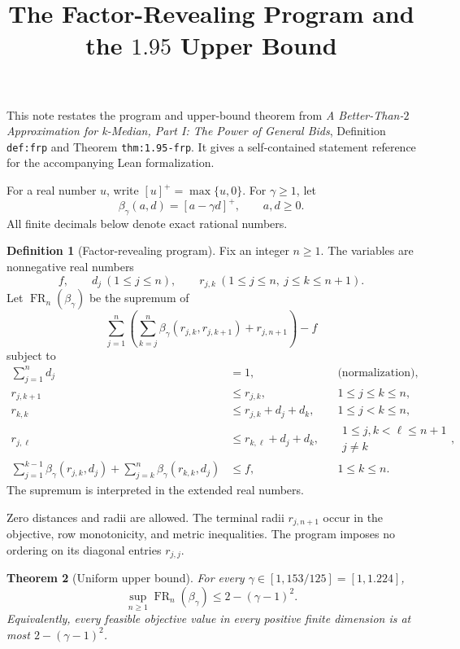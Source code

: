 \documentclass[11pt]{article}
\title{The Factor-Revealing Program and the $1.95$ Upper Bound}
\author{}
\date{}
\newtheorem{theorem}{Theorem}
\theoremstyle{definition}
\newtheorem{definition}[theorem]{Definition}
\newcommand{\FR}{\operatorname{FR}}
\newcommand{\pos}[1]{\left[#1\right]^+}
\begin{document}
\maketitle

This note restates the program and upper-bound theorem from
\emph{A Better-Than-$2$ Approximation for k-Median, Part I: The Power of
General Bids}, Definition \texttt{def:frp} and Theorem
\texttt{thm:1.95-frp}. It gives a self-contained statement reference for
the accompanying Lean formalization.

For a real number $u$, write $\pos{u}=\max\{u,0\}$. For $\gamma\ge1$, let
\[
  \beta_\gamma(a,d)=\pos{a-\gamma d},\qquad a,d\ge0.
\]
All finite decimals below denote exact rational numbers.

\begin{definition}[Factor-revealing program]\label{def:frp}
Fix an integer $n\ge1$. The variables are nonnegative real numbers
\[
  f,\qquad d_j\ (1\le j\le n),\qquad
  r_{j,k}\ (1\le j\le n,\ j\le k\le n+1).
\]
Let $\FR_n(\beta_\gamma)$ be the supremum of
\begin{equation}\label{eq:objective}
  \sum_{j=1}^n\left(
    \sum_{k=j}^n\beta_\gamma(r_{j,k},r_{j,k+1})+r_{j,n+1}
  \right)-f
\end{equation}
subject to
\begin{align}
  \sum_{j=1}^n d_j&=1,
    &&\text{(normalization)},\label{eq:normalization}\\
  r_{j,k+1}&\le r_{j,k},
    &&1\le j\le k\le n,\label{eq:row}\\
  r_{k,k}&\le r_{j,k}+d_j+d_k,
    &&1\le j<k\le n,\label{eq:triangle}\\
  r_{j,\ell}&\le r_{k,\ell}+d_j+d_k,
    &&\substack{1\le j,k<\ell\le n+1\\j\ne k},\label{eq:metric}\\
  \sum_{j=1}^{k-1}\beta_\gamma(r_{j,k},d_j)
    +\sum_{j=k}^n\beta_\gamma(r_{k,k},d_j)&\le f,
    &&1\le k\le n.\label{eq:facility}
\end{align}
The supremum is interpreted in the extended real numbers.
\end{definition}

Zero distances and radii are allowed. The terminal radii $r_{j,n+1}$
occur in the objective, row monotonicity, and metric inequalities.
The program imposes no ordering on its diagonal entries $r_{j,j}$.

\begin{theorem}[Uniform upper bound]\label{thm:1.95-frp}
For every $\gamma\in[1,153/125]=[1,1.224]$,
\[
  \sup_{n\ge1}\FR_n(\beta_\gamma)\le 2-(\gamma-1)^2.
\]
Equivalently, every feasible objective value in every positive finite
dimension is at most $2-(\gamma-1)^2$.
\end{theorem}
\end{document}
